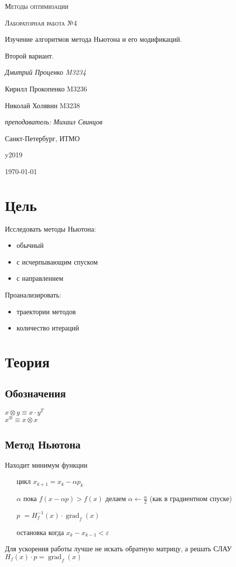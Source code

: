 \documentclass[russian, english]{article}
\begin{document}
\begin{titlepage}
\centering
	{\scshape\LARGE Методы оптимизации \par}
	\vspace{1cm}
	{\scshape\Large Лабораторная работа №4\par Изучение алгоритмов метода Ньютона и его модификаций.\par Второй вариант.\par}
	\vspace{2cm}
	{\Large\itshape Дмитрий Проценко M3234 \par
	Кирилл Прокопенко M3236 \par
	Николай Холявин M3238 \par}
	\vfill
	{\itshape преподаватель: Михаил Свинцов\par}
	\vfill
	Санкт-Петербург, ИТМО\par y2019
	\vfill
	{\large \today\par}
\end{titlepage}

\tableofcontents
\newpage

\section{Цель}
Исследовать методы Ньютона:
\begin{itemize}
	\item обычный
	\item с исчерпывающим спуском
	\item с направлением
\end{itemize}
Проанализировать:
\begin{itemize}
	\item траектории методов
	\item количество итераций
\end{itemize}

\section{Теория}
\subsection{Обозначения}
$x\otimes y\equiv x\cdot y^T$\\
$x^\otimes \equiv x\otimes x$\\
\subsection{Метод Ньютона}
Находит минимум функции
\begin{itemize}
	\item[цикл] $x_{k+1} = x_{k} - \alpha p_{k}$
	\item[$\alpha$] пока $f(x - \alpha p) > f(x)$ делаем $\alpha\leftarrow \frac{\alpha}{2}$ (как в градиентном спуске)
	\item[$p$] $= H_f^{-1}(x)\cdot\operatorname{grad}_f(x)$
	\item[остановка] когда $x_k - x_{k - 1} < \varepsilon$
\end{itemize}
Для ускорения работы лучше не искать обратную матрицу, а решать СЛАУ $H_f(x)\cdot p=\operatorname{grad}_f(x)$
\end{document}
